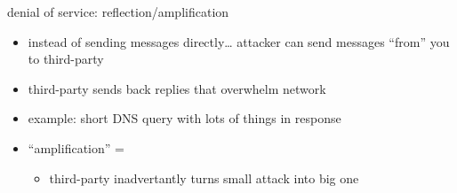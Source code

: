 \begin{frame}{denial of service: reflection/amplification}
    \begin{itemize}
    \item instead of sending messages directly\ldots
        attacker can send messages ``from'' you to third-party
    \item third-party sends back replies that overwhelm network
    \item example: short DNS query with lots of things in response
    \vspace{.5cm}
    \item ``amplification'' =
        \begin{itemize}
        \item third-party inadvertantly turns small attack into big one
        \end{itemize}
    \end{itemize}    
\end{frame} 
